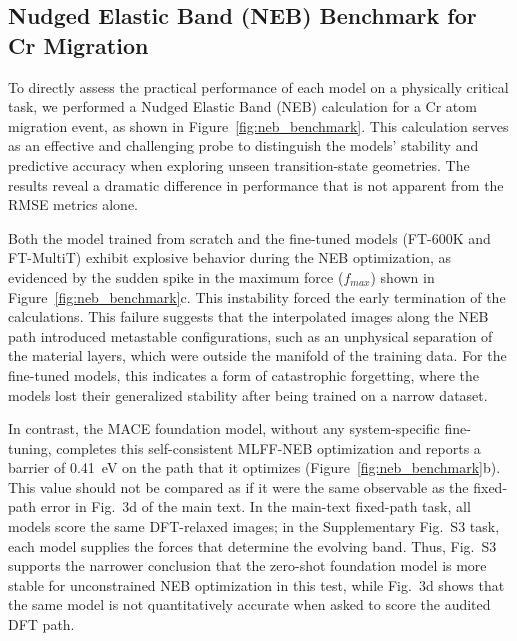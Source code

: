 \documentclass[pdflatex,sn-mathphys-num]{sn-jnl}%
\providecommand{\reviewermap}[3]{}
\theoremstyle{thmstyleone}%
\theoremstyle{thmstyletwo}%
\theoremstyle{thmstylethree}%
\begin{document}
\subsection{Nudged Elastic Band (NEB) Benchmark for Cr Migration}

To directly assess the practical performance of each model on a physically critical task, we performed a Nudged Elastic Band (NEB) calculation for a Cr atom migration event, as shown in Figure~\ref{fig:neb_benchmark}. This calculation serves as an effective and challenging probe to distinguish the models' stability and predictive accuracy when exploring unseen transition-state geometries. The results reveal a dramatic difference in performance that is not apparent from the RMSE metrics alone.

Both the model trained from scratch and the fine-tuned models (FT-600K and FT-MultiT) exhibit explosive behavior during the NEB optimization, as evidenced by the sudden spike in the maximum force ($f_{max}$) shown in Figure~\ref{fig:neb_benchmark}c. This instability forced the early termination of the calculations. This failure suggests that the interpolated images along the NEB path introduced metastable configurations, such as an unphysical separation of the material layers, which were outside the manifold of the training data. For the fine-tuned models, this indicates a form of catastrophic forgetting, where the models lost their generalized stability after being trained on a narrow dataset.

\reviewermap{REV-A1}{partial}{SI Fig. S3 is self-consistent MLFF NEB; 0.41 eV is a model-reported MLFF barrier, not a fixed-path DFT-reference error.}
In contrast, the MACE foundation model, without any system-specific fine-tuning, completes this self-consistent MLFF-NEB optimization and reports a barrier of 0.41~eV on the path that it optimizes (Figure~\ref{fig:neb_benchmark}b). This value should not be compared as if it were the same observable as the fixed-path error in Fig.~3d of the main text. In the main-text fixed-path task, all models score the same DFT-relaxed images; in the Supplementary Fig.~S3 task, each model supplies the forces that determine the evolving band. Thus, Fig.~S3 supports the narrower conclusion that the zero-shot foundation model is more stable for unconstrained NEB optimization in this test, while Fig.~3d shows that the same model is not quantitatively accurate when asked to score the audited DFT path.
\end{document}
